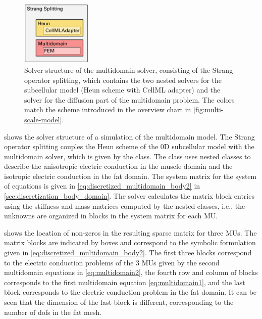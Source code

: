 \begin{figure}
  \centering%
  \includegraphics[width=0.3\textwidth]{images/implementation/solver_structure_multidomain.pdf}%
  \caption{Solver structure of the multidomain solver, consisting of the Strang operator splitting, which contains the two nested solvers for the subcellular model (Heun scheme with CellML adapter) and the solver for the diffusion part of the multidomain problem. The colors match the scheme introduced in the overview chart in \cref{fig:multi-scale-model}.}%
  \label{fig:multidomain_matrix_mesh}%
\end{figure}%

 shows the solver structure of a simulation of the multidomain model. The Strang operator splitting couples the Heun scheme of the 0D subcellular model with the multidomain solver, which is given by the  class. The  class uses nested  classes to describe the anisotropic electric conduction in the muscle domain and the isotropic electric conduction in the fat domain.
The system matrix for the system of equations is given in \cref{eq:discretized_multidomain_body2} in \cref{sec:discretization_body_domain}. 
The solver calculates the matrix block entries using the stiffness and mass matrices computed by the nested  classes, i.e., the unknowns are organized in blocks in the system matrix for each MU.

 shows the location of non-zeros in the resulting sparse matrix for three MUs. The matrix blocks are indicated by boxes and correspond to the symbolic formulation given in \cref{eq:discretized_multidomain_body2}. The first three blocks correspond to the electric conduction problems of the 3 MUs given by the second multidomain equations in \cref{eq:multidomain2}, the fourth row and column of blocks corresponds to the first multidomain equation \cref{eq:multidomain1}, and the last block corresponds to the electric conduction problem in the fat domain. It can be seen that the dimension of the last block is different, corresponding to the number of dofs in the fat mesh.

